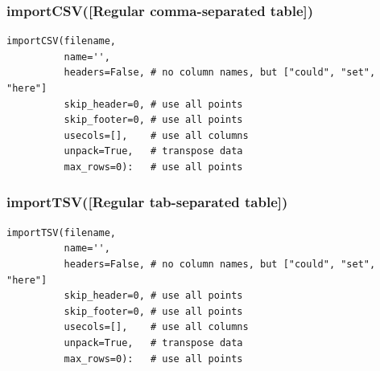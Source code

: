 \documentclass[10pt]{report}
\begin{document}
\subsubsection*{\textbf{importCSV}({\color{args}[Regular comma-separated table]})}
\begin{lstlisting}[caption=importCSV]
importCSV(filename,
          name='',
          headers=False, # no column names, but ["could", "set", "here"]
          skip_header=0, # use all points
          skip_footer=0, # use all points
          usecols=[],    # use all columns
          unpack=True,   # transpose data
          max_rows=0):   # use all points
\end{lstlisting}

\subsubsection*{\textbf{importTSV}({\color{args}[Regular tab-separated table]})}
\begin{lstlisting}[caption=importTSV]
importTSV(filename,
          name='',
          headers=False, # no column names, but ["could", "set", "here"]
          skip_header=0, # use all points
          skip_footer=0, # use all points
          usecols=[],    # use all columns
          unpack=True,   # transpose data
          max_rows=0):   # use all points
\end{lstlisting}
\end{document}

